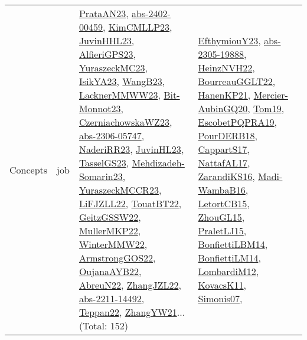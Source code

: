 {\begin{longtable}{lp{3cm}>{\raggedright}p{6cm}>{\raggedright}p{6cm}p{8cm}}
Concepts & job & \href{articles/PrataAN23.pdf}{PrataAN23}\cite{PrataAN23}, \href{articles/abs-2402-00459.pdf}{abs-2402-00459}\cite{abs-2402-00459}, \href{papers/KimCMLLP23.pdf}{KimCMLLP23}\cite{KimCMLLP23}, \href{papers/JuvinHHL23.pdf}{JuvinHHL23}\cite{JuvinHHL23}, \href{articles/AlfieriGPS23.pdf}{AlfieriGPS23}\cite{AlfieriGPS23}, \href{papers/YuraszeckMC23.pdf}{YuraszeckMC23}\cite{YuraszeckMC23}, \href{articles/IsikYA23.pdf}{IsikYA23}\cite{IsikYA23}, \href{papers/WangB23.pdf}{WangB23}\cite{WangB23}, \href{articles/LacknerMMWW23.pdf}{LacknerMMWW23}\cite{LacknerMMWW23}, \href{papers/Bit-Monnot23.pdf}{Bit-Monnot23}\cite{Bit-Monnot23}, \href{articles/CzerniachowskaWZ23.pdf}{CzerniachowskaWZ23}\cite{CzerniachowskaWZ23}, \href{articles/abs-2306-05747.pdf}{abs-2306-05747}\cite{abs-2306-05747}, \href{articles/NaderiRR23.pdf}{NaderiRR23}\cite{NaderiRR23}, \href{papers/JuvinHL23.pdf}{JuvinHL23}\cite{JuvinHL23}, \href{papers/TasselGS23.pdf}{TasselGS23}\cite{TasselGS23}, \href{papers/Mehdizadeh-Somarin23.pdf}{Mehdizadeh-Somarin23}\cite{Mehdizadeh-Somarin23}, \href{articles/YuraszeckMCCR23.pdf}{YuraszeckMCCR23}\cite{YuraszeckMCCR23}, \href{papers/LiFJZLL22.pdf}{LiFJZLL22}\cite{LiFJZLL22}, \href{papers/TouatBT22.pdf}{TouatBT22}\cite{TouatBT22}, \href{papers/GeitzGSSW22.pdf}{GeitzGSSW22}\cite{GeitzGSSW22}, \href{articles/MullerMKP22.pdf}{MullerMKP22}\cite{MullerMKP22}, \href{papers/WinterMMW22.pdf}{WinterMMW22}\cite{WinterMMW22}, \href{papers/ArmstrongGOS22.pdf}{ArmstrongGOS22}\cite{ArmstrongGOS22}, \href{papers/OujanaAYB22.pdf}{OujanaAYB22}\cite{OujanaAYB22}, \href{articles/AbreuN22.pdf}{AbreuN22}\cite{AbreuN22}, \href{papers/ZhangJZL22.pdf}{ZhangJZL22}\cite{ZhangJZL22}, \href{articles/abs-2211-14492.pdf}{abs-2211-14492}\cite{abs-2211-14492}, \href{papers/Teppan22.pdf}{Teppan22}\cite{Teppan22}, \href{articles/ZhangYW21.pdf}{ZhangYW21}\cite{ZhangYW21}... (Total: 152) & \href{papers/EfthymiouY23.pdf}{EfthymiouY23}\cite{EfthymiouY23}, \href{articles/abs-2305-19888.pdf}{abs-2305-19888}\cite{abs-2305-19888}, \href{articles/HeinzNVH22.pdf}{HeinzNVH22}\cite{HeinzNVH22}, \href{articles/BourreauGGLT22.pdf}{BourreauGGLT22}\cite{BourreauGGLT22}, \href{papers/HanenKP21.pdf}{HanenKP21}\cite{HanenKP21}, \href{papers/Mercier-AubinGQ20.pdf}{Mercier-AubinGQ20}\cite{Mercier-AubinGQ20}, \href{papers/Tom19.pdf}{Tom19}\cite{Tom19}, \href{articles/EscobetPQPRA19.pdf}{EscobetPQPRA19}\cite{EscobetPQPRA19}, \href{articles/PourDERB18.pdf}{PourDERB18}\cite{PourDERB18}, \href{papers/CappartS17.pdf}{CappartS17}\cite{CappartS17}, \href{articles/NattafAL17.pdf}{NattafAL17}\cite{NattafAL17}, \href{articles/ZarandiKS16.pdf}{ZarandiKS16}\cite{ZarandiKS16}, \href{papers/Madi-WambaB16.pdf}{Madi-WambaB16}\cite{Madi-WambaB16}, \href{articles/LetortCB15.pdf}{LetortCB15}\cite{LetortCB15}, \href{papers/ZhouGL15.pdf}{ZhouGL15}\cite{ZhouGL15}, \href{papers/PraletLJ15.pdf}{PraletLJ15}\cite{PraletLJ15}, \href{articles/BonfiettiLBM14.pdf}{BonfiettiLBM14}\cite{BonfiettiLBM14}, \href{papers/BonfiettiLM14.pdf}{BonfiettiLM14}\cite{BonfiettiLM14}, \href{articles/LombardiM12.pdf}{LombardiM12}\cite{LombardiM12}, \href{articles/KovacsK11.pdf}{KovacsK11}\cite{KovacsK11}, \href{articles/Simonis07.pdf}{Simonis07}\cite{Simonis07}, 
\end{longtable}}
